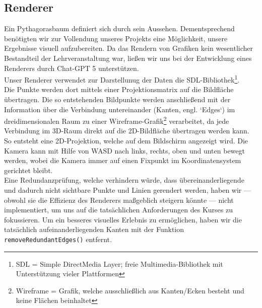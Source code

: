 \subsection{Renderer}
Ein Pythagorasbaum definiert sich durch sein Aussehen. Dementsprechend benötigten wir zur Vollendung unseres Projekts eine Möglichkeit,
unsere Ergebnisse visuell aufzubereiten. Da das Rendern von Grafiken kein wesentlicher Bestandteil der Lehrveranstaltung war, ließen wir uns
bei der Entwicklung eines Renderers durch Chat-GPT 5 unterstützen. \\
Unser Renderer verwendet zur Darstellunug der Daten die SDL-Bibliothek\footnote{SDL = Simple DirectMedia Layer; freie Multimedia-Bibliothek mit 
Unterstützung vieler Plattformen}.\\
\noindent
Die Punkte werden dort mittels einer Projektionsmatrix auf die Bildfläche übertragen. Die so entstehenden Bildpunkte 
werden anschließend mit der Information über die Verbindung untereinander (Kanten, engl. `Edges`) im dreidimensionalen 
Raum zu einer Wireframe-Grafik\footnote{Wireframe = Grafik, welche ausschließlich aus Kanten/Ecken besteht und keine 
Flächen beinhaltet} verarbeitet, da jede Verbindung im 3D-Raum direkt auf die 2D-Bildfläche übertragen werden kann. 
So entsteht eine 2D-Projektion, welche auf dem Bildschirm angezeigt wird. Die Kamera kann mit Hilfe von WASD 
nach links, rechts, oben und unten bewegt werden, wobei die Kamera immer auf einen Fixpunkt im Koordinatensystem
gerichtet bleibt.\\
Eine Redundanzprüfung, welche verhindern würde, dass übereinanderliegende und dadurch nicht sichtbare Punkte und 
Linien gerendert werden, haben wir --- obwohl sie die Effizienz des Renderers maßgeblich steigern könnte --- nicht 
implementiert, um uns auf die tatsächlichen Anforderungen des Kurses zu fokussieren. Um ein besseres visuelles 
Erlebnis zu ermöglichen, haben wir die tatsächlich aufeinanderliegenden Kanten mit der Funktion 
\texttt{removeRedundantEdges()} entfernt. 



